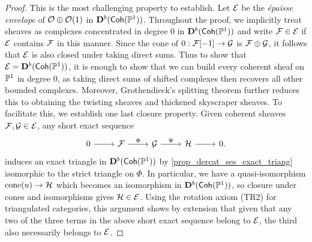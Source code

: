 \begin{proof}
  This is the most challenging property to establish.
  Let $\triangcat{E}$ be the \emph{\'{e}paisse envelope} of
  $\tiltshf$ in $\dercat[b]{\Coh(\proj{1})}$.
  Throughout the proof, we implicitly treat sheaves as complexes
  concentrated in degree 0 in $\dercat[b]{\Coh(\proj{1})}$ and write
  $\shf{F} \in \triangcat{E}$ if $\triangcat{E}$ contains $\shf{F}$
  in this manner.
  Since the cone of $0: \shf{F}[-1] \to \shf{G}$ is $\shf{F} \biprod
  \shf{G}$, it follows that $\triangcat{E}$ is also closed under
  taking direct sums.
  Thus to show that $\triangcat{E} = \dercat[b]{\Coh(\proj{1})}$, it
  is enough to show that we can build every coherent sheaf on
  $\proj{1}$ in degree 0, as taking direct sums of shifted complexes
  then recovers all other bounded complexes.
  Moreover, Grothendieck's splitting theorem further reduces this to
  obtaining the twisting sheaves and thickened skyscraper sheaves.
  To facilitate this, we establish one last closure property.
  Given coherent sheaves $\shf{F}, \shf{G} \in \triangcat{E}$, any
  short exact sequence
  \[
    \begin{tikzcd}
      0 & {\shf{F}} & {\shf{G}} & {\shf{H}} & 0.
      \arrow[from=1-1, to=1-2]
      \arrow["\Phi", from=1-2, to=1-3]
      \arrow["\Psi", from=1-3, to=1-4]
      \arrow[from=1-4, to=1-5]
    \end{tikzcd}
  \]
  induces an exact triangle in $\dercat[b]{\Coh(\proj{1})}$ by
  \cref{prop_dercat_ses_exact_triang} isomorphic to the strict
  triangle on $\Phi$.
  In particular, we have a quasi-isomorphism $\cone{u} \to \shf{H}$
  which becomes an isomorphism in $\dercat[b]{\Coh(\proj{1})}$, so
  closure under cones and isomorphisms gives $\shf{H} \in \triangcat{E}$.
  Using the rotation axiom (TR2) for triangulated categories, this
  argument shows by extension that given that any two of the three
  terms in the above short exact sequence belong to $\shf{E}$, the
  third also necessarily belongs to $\shf{E}$.


\end{proof}
